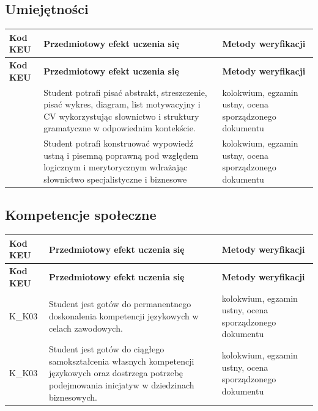 \documentclass[12pt, a4paper]{article}
\newcommand{\thdrule}{\noalign{\global\setlength{\extrarowheight}{0pt}}}
\newcommand{\thdend}{\noalign{\global\setlength{\extrarowheight}{3pt}}}
\begin{document}
\subsection*{Umiejętności}
{\scriptsize
\begin{longtable}{m{1.6cm}m{9.0cm}m{4.2cm}}
\thdrule\toprule
\rowcolor{pjatkRed} {\color{white}\footnotesize\textbf{\vphantom{Ag}Kod KEU}} & {\color{white}\footnotesize\textbf{\vphantom{Ag}Przedmiotowy efekt uczenia się}} & {\color{white}\footnotesize\textbf{\vphantom{Ag}Metody weryfikacji}} \\
\midrule\thdend
\endfirsthead
\thdrule\toprule
\rowcolor{pjatkRed} {\color{white}\footnotesize\textbf{\vphantom{Ag}Kod KEU}} & {\color{white}\footnotesize\textbf{\vphantom{Ag}Przedmiotowy efekt uczenia się}} & {\color{white}\footnotesize\textbf{\vphantom{Ag}Metody weryfikacji}} \\
\midrule\thdend
\endhead
  \rowcolor{tableRowLight}  & Student potrafi pisać abstrakt, streszczenie, pisać wykres, diagram, list motywacyjny i CV wykorzystując słownictwo i struktury gramatyczne w odpowiednim kontekście. & kolokwium, egzamin ustny, ocena sporządzonego dokumentu \\
  \rowcolor{tableRowAlt}  & Student potrafi konstruować wypowiedź ustną i pisemną poprawną pod względem logicznym i merytorycznym wdrażając słownictwo specjalistyczne i biznesowe & kolokwium, egzamin ustny, ocena sporządzonego dokumentu \\
\bottomrule
\end{longtable}}

\subsection*{Kompetencje społeczne}
{\scriptsize
\begin{longtable}{m{1.6cm}m{9.0cm}m{4.2cm}}
\thdrule\toprule
\rowcolor{pjatkRed} {\color{white}\footnotesize\textbf{\vphantom{Ag}Kod KEU}} & {\color{white}\footnotesize\textbf{\vphantom{Ag}Przedmiotowy efekt uczenia się}} & {\color{white}\footnotesize\textbf{\vphantom{Ag}Metody weryfikacji}} \\
\midrule\thdend
\endfirsthead
\thdrule\toprule
\rowcolor{pjatkRed} {\color{white}\footnotesize\textbf{\vphantom{Ag}Kod KEU}} & {\color{white}\footnotesize\textbf{\vphantom{Ag}Przedmiotowy efekt uczenia się}} & {\color{white}\footnotesize\textbf{\vphantom{Ag}Metody weryfikacji}} \\
\midrule\thdend
\endhead
  \rowcolor{tableRowLight} K\_K03 & Student jest gotów do permanentnego doskonalenia kompetencji językowych w celach zawodowych. & kolokwium, egzamin ustny, ocena sporządzonego dokumentu \\
  \rowcolor{tableRowAlt} K\_K03 & Student jest gotów do ciągłego samokształcenia własnych kompetencji językowych oraz dostrzega potrzebę podejmowania inicjatyw w dziedzinach biznesowych. & kolokwium, egzamin ustny, ocena sporządzonego dokumentu \\
\bottomrule
\end{longtable}}
\end{document}
